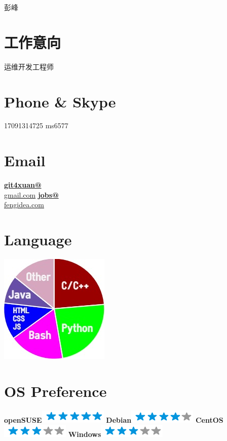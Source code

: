 \documentclass[]{friggeri-cv}
\begin{document}
      { 彭峰 } 
      



\begin{aside}
  \section{工作意向}
    运维开发工程师
    ~
  \section{Phone \& Skype}
    17091314725
    ms6577
    ~
  \section{Email}
    \href{mailto:git4xuan@gmail.com}{\textbf{git4xuan@}\\gmail.com}
    \href{mailto:jobs@fengidea.com}{\textbf{jobs@}\\fengidea.com}
    ~
    ~
  \section{Language}
    \includegraphics[scale=0.72]{img/programming.jpg}
    ~
  \section{OS Preference}
    \textbf{openSUSE}\includegraphics[scale=0.40]{img/5stars.png}
    \textbf{Debian}\includegraphics[scale=0.40]{img/4stars.png}
    \textbf{CentOS}\includegraphics[scale=0.40]{img/3stars.png}
    \textbf{Windows}\includegraphics[scale=0.40]{img/3stars.png}
    ~

\end{aside}
\end{document}
